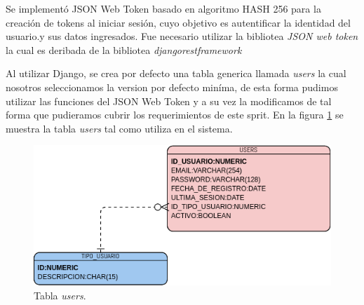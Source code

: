         Se implementó JSON Web Token basado en algoritmo HASH 256 para la creación de tokens al iniciar sesión, cuyo objetivo es 
        autentificar la identidad del usuario.y sus datos ingresados. Fue necesario utilizar la bibliotea \textit{JSON web token} 
        la cual es deribada de la bibliotea \textit{djangorestframework}

        Al utilizar Django, se crea por defecto una tabla generica llamada \textit{users} la cual nosotros seleccionamos
        la version por defecto miníma, de esta forma pudimos utilizar las funciones del JSON Web Token y a su vez la modificamos 
        de tal forma que pudieramos cubrir los requerimientos de este sprit.
        En la figura \ref{tbdb:users} se muestra la tabla \textit{users} tal como utiliza en el sistema. 
        \begin{figure}[H]
            \begin{center}
                \includegraphics[width=.7\textwidth]{sprints/imagenes/sp1mdd.png}
            \end{center}
            
            \caption{Tabla \textit{users}.}
            \label{tbdb:users}
        \end{figure}
    

